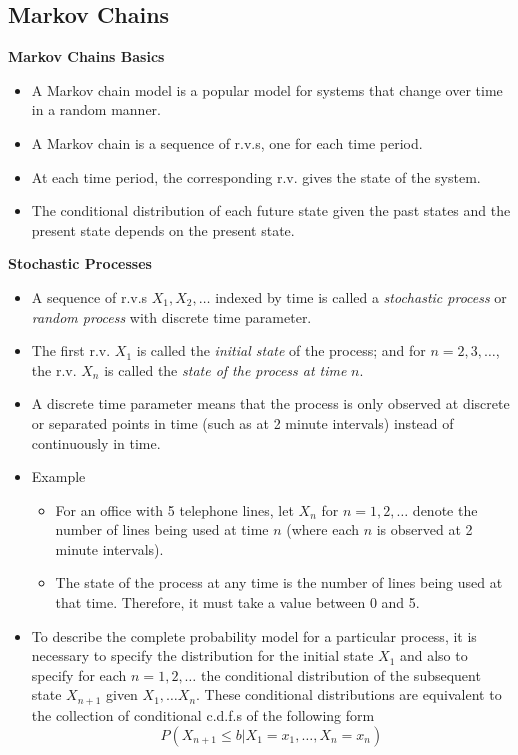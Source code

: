 \documentclass[11pt]{article}
\begin{document}
\subsection{Markov Chains}

\textbf{Markov Chains Basics}
\begin{itemize}
    \item A Markov chain model is a popular model for systems that change over time in a 
    random manner.
    \item A Markov chain is a sequence of r.v.s, one for each time period. 
    \item At each time period, the corresponding r.v. gives the state of the system.
    \item The conditional distribution of each future state given the past states and the 
    present state depends on the present state. 
\end{itemize}

\textbf{Stochastic Processes}
\begin{itemize}
    \item A sequence of r.v.s $X_1, X_2, \ldots$ indexed by time is called a 
    \textit{stochastic process} or \textit{random process} with discrete time parameter. 
    \item The first r.v. $X_1$ is called the \textit{initial state} of the process; and for 
    $n=2, 3, \ldots$, the r.v. $X_n$ is called the \textit{state of the process at time} $n$.
    \item A discrete time parameter means that the process is only observed at discrete or 
    separated points in time (such as at 2 minute intervals) instead of continuously in time.
    \item Example 
    \begin{itemize}
        \item For an office with 5 telephone lines, let $X_n$ for $n=1, 2, \ldots$ denote the 
        number of lines being used at time $n$ (where each $n$ is observed at 2 minute 
        intervals). 
        \item The state of the process at any time is the number of lines being used at that 
        time. Therefore, it must take a value between 0 and 5. 
    \end{itemize}
    \item To describe the complete probability model for a particular process, it is necessary 
    to specify the distribution for the initial state $X_1$ and also to specify for each $n=1,
    2, \ldots$ the conditional distribution of the subsequent state $X_{n+1}$ given $X_1, 
    \ldots X_n$. These conditional distributions are equivalent to the collection of 
    conditional c.d.f.s of the following form 
    \[ P(X_{n+1} \le b | X_1 = x_1, \ldots, X_n = x_n) \]
\end{itemize}
\end{document}
